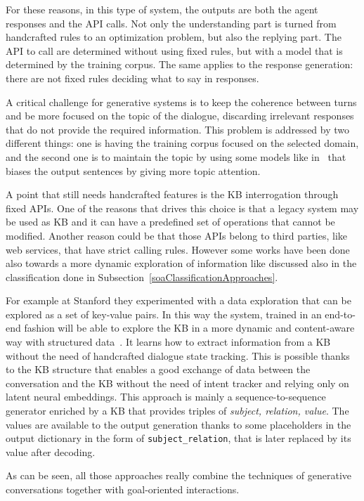 For these reasons, in this type of system, the outputs are both the agent responses and the API calls. Not only the understanding part is turned from handcrafted rules to an optimization problem, but also the replying part. The API to call are determined without using fixed rules, but with a model that is determined by the training corpus. The same applies to the response generation: there are not fixed rules deciding what to say in responses.

A critical challenge for generative systems is to keep the coherence between turns and be more focused on the topic of the dialogue, discarding irrelevant responses that do not provide the required information. This problem is addressed by two different things: one is having the training corpus focused on the selected domain, and the second one is to maintain the topic by using some models like in~\cite{xing2017topic} that biases the output sentences by giving more topic attention.

A point that still needs handcrafted features is the KB interrogation through fixed APIs. One of the reasons that drives this choice is that a legacy system may be used as KB and it can have a predefined set of operations that cannot be modified. Another reason could be that those APIs belong to third parties, like web services, that have strict calling rules. However some works have been done also towards a more dynamic exploration of information like discussed also in the classification done in Subsection~\ref{soaClassificationApproaches}.

For example at Stanford they experimented with a data exploration that can be explored as a set of key-value pairs. In this way the system, trained in an end-to-end fashion will be able to explore the KB in a more dynamic and content-aware way with structured data~\cite{eric2017key}. It learns how to extract information from a KB without the need of handcrafted dialogue state tracking. This is possible thanks to the KB structure that enables a good exchange of data between the conversation and the KB without the need of intent tracker and relying only on latent neural embeddings. This approach is mainly a sequence-to-sequence generator enriched by a KB that provides triples of \textit{subject, relation, value}. The values are available to the output generation thanks to some placeholders in the output dictionary in the form of \texttt{subject\_relation}, that is later replaced by its value after decoding.

As can be seen, all those approaches really combine the techniques of generative conversations together with goal-oriented interactions.

